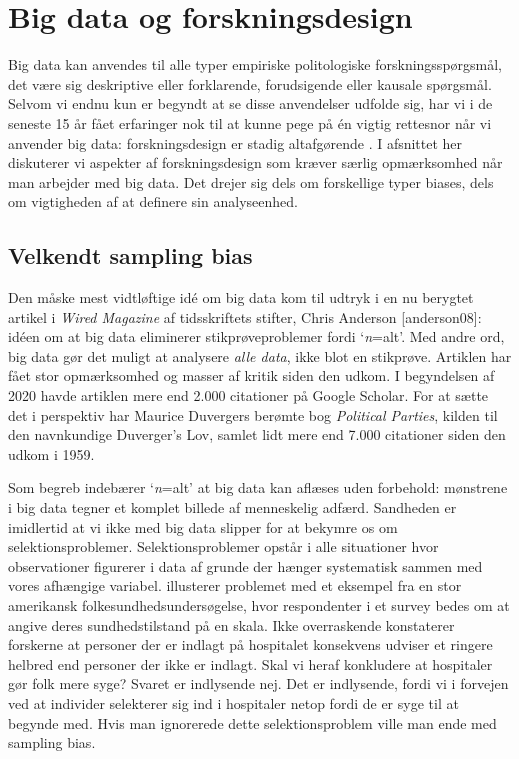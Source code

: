 \documentclass[12pt,]{article}
\begin{document}
\hypertarget{big-data-og-forskningsdesign}{%
\section{Big data og
forskningsdesign}\label{big-data-og-forskningsdesign}}

Big data kan anvendes til alle typer empiriske politologiske
forskningsspørgsmål, det være sig deskriptive eller forklarende,
forudsigende eller kausale spørgsmål. Selvom vi endnu kun er begyndt at
se disse anvendelser udfolde sig, har vi i de seneste 15 år fået
erfaringer nok til at kunne pege på én vigtig rettesnor når vi anvender
big data: forskningsdesign er stadig altafgørende
\citetext{\citealp[jf.][s. 13]{toshkov16}; \citealp{CG15}}. I afsnittet
her diskuterer vi aspekter af forskningsdesign som kræver særlig
opmærksomhed når man arbejder med big data. Det drejer sig dels om
forskellige typer biases, dels om vigtigheden af at definere sin
analyseenhed.

\hypertarget{velkendt-sampling-bias}{%
\subsection{Velkendt sampling bias}\label{velkendt-sampling-bias}}

Den måske mest vidtløftige idé om big data kom til udtryk i en nu
berygtet artikel i \emph{Wired Magazine} af tidsskriftets stifter, Chris
Anderson {[}anderson08{]}: idéen om at big data eliminerer
stikprøveproblemer fordi `\emph{n}=alt'. Med andre ord, big data gør det
muligt at analysere \emph{alle data}, ikke blot en stikprøve. Artiklen
har fået stor opmærksomhed og masser af kritik siden den udkom. I
begyndelsen af 2020 havde artiklen mere end 2.000 citationer på Google
Scholar. For at sætte det i perspektiv har Maurice Duvergers berømte bog
\emph{Political Parties}, kilden til den navnkundige Duverger's Lov,
samlet lidt mere end 7.000 citationer siden den udkom i 1959.

Som begreb indebærer `\emph{n}=alt' at big data kan aflæses uden
forbehold: mønstrene i big data tegner et komplet billede af menneskelig
adfærd. Sandheden er imidlertid at vi ikke med big data slipper for at
bekymre os om selektionsproblemer. Selektionsproblemer opstår i alle
situationer hvor observationer figurerer i data af grunde der hænger
systematisk sammen med vores afhængige variabel. \citet{AP08} illusterer
problemet med et eksempel fra en stor amerikansk
folkesundhedsundersøgelse, hvor respondenter i et survey bedes om at
angive deres sundhedstilstand på en skala. Ikke overraskende konstaterer
forskerne at personer der er indlagt på hospitalet konsekvens udviser et
ringere helbred end personer der ikke er indlagt. Skal vi heraf
konkludere at hospitaler gør folk mere syge? Svaret er indlysende nej.
Det er indlysende, fordi vi i forvejen ved at individer selekterer sig
ind i hospitaler netop fordi de er syge til at begynde med. Hvis man
ignorerede dette selektionsproblem ville man ende med sampling bias.
\end{document}
